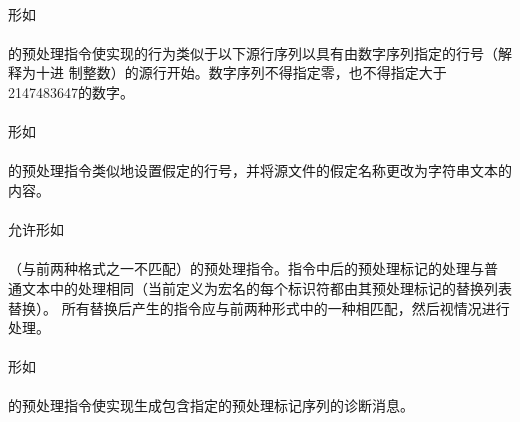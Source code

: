 {\paragraph{}
形如                                                                          \\
\mbox{\hspace{4em} }                  \\
的预处理指令使实现的行为类似于以下源行序列以具有由数字序列指定的行号（解释为十进
制整数）的源行开始。数字序列不得指定零，也不得指定大于2147483647的数字。

\paragraph{}
形如                                                                          \\
\mbox{\hspace{4em} 
  \tm{\dq}\tm{\dq} }               \\
的预处理指令类似地设置假定的行号，并将源文件的假定名称更改为字符串文本的内容。

\paragraph{}
允许形如                                                                      \\
\mbox{\hspace{4em} }                       \\
（与前两种格式之一不匹配）的预处理指令。指令中后的预处理标记的处理与普
通文本中的处理相同（当前定义为宏名的每个标识符都由其预处理标记的替换列表替换）。
所有替换后产生的指令应与前两种形式中的一种相匹配，然后视情况进行处理。

\semantic
\paragraph{}
形如                                                                          \\
\mbox{\hspace{4em} }            \\
的预处理指令使实现生成包含指定的预处理标记序列的诊断消息。

}
